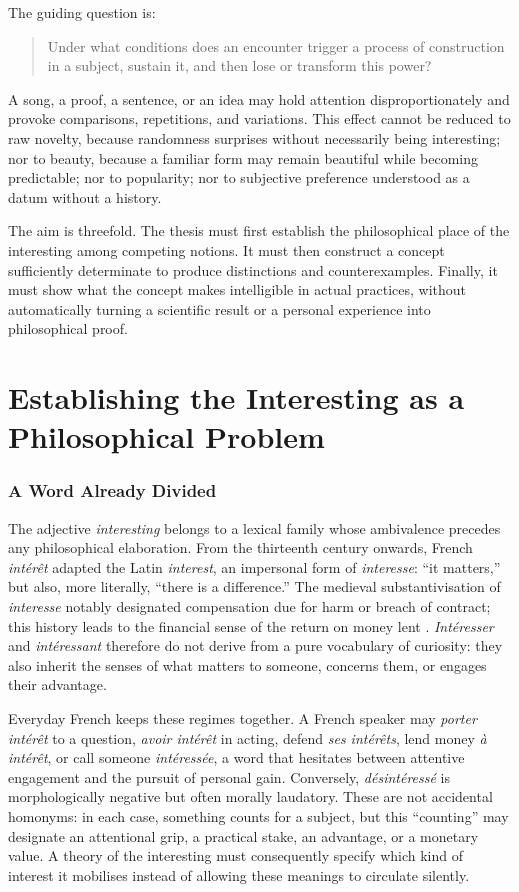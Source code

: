 \documentclass[11pt,a4paper]{article}
\begin{document}
The guiding question is:

\begin{quote}
Under what conditions does an encounter trigger a process of construction in a
subject, sustain it, and then lose or transform this power?
\end{quote}

A song, a proof, a sentence, or an idea may hold attention disproportionately
and provoke comparisons, repetitions, and variations. This effect cannot be
reduced to raw novelty, because randomness surprises without necessarily being
interesting; nor to beauty, because a familiar form may remain beautiful while
becoming predictable; nor to popularity; nor to subjective preference
understood as a datum without a history.

The aim is threefold. The thesis must first establish the philosophical place of
the interesting among competing notions. It must then construct a concept
sufficiently determinate to produce distinctions and counterexamples. Finally,
it must show what the concept makes intelligible in actual practices, without
automatically turning a scientific result or a personal experience into
philosophical proof.

\part{Establishing the Interesting as a Philosophical Problem}

\section{A Word Already Divided}

The adjective \emph{interesting} belongs to a lexical family whose ambivalence
precedes any philosophical elaboration. From the thirteenth century onwards,
French \emph{intérêt} adapted the Latin \emph{interest}, an impersonal form of
\emph{interesse}: ``it matters,'' but also, more literally, ``there is a
difference.'' The medieval substantivisation of \emph{interesse} notably
designated compensation due for harm or breach of contract; this history leads
to the financial sense of the return on money lent
\parencite{academie2026interet,cnrtl2026interet}. \emph{Intéresser} and
\emph{intéressant} therefore do not derive from a pure vocabulary of curiosity:
they also inherit the senses of what matters to someone, concerns them, or
engages their advantage.

Everyday French keeps these regimes together. A French speaker may \emph{porter
intérêt} to a question, \emph{avoir intérêt} in acting, defend \emph{ses
intérêts}, lend money \emph{à intérêt}, or call someone \emph{intéressée}, a
word that hesitates between attentive engagement and the pursuit of personal gain.
Conversely, \emph{désintéressé} is morphologically negative but often morally
laudatory. These are not accidental homonyms: in each case, something counts
for a subject, but this ``counting'' may designate an attentional grip, a
practical stake, an advantage, or a monetary value. A theory of the interesting
must consequently specify which kind of interest it mobilises instead of
allowing these meanings to circulate silently.
\end{document}

